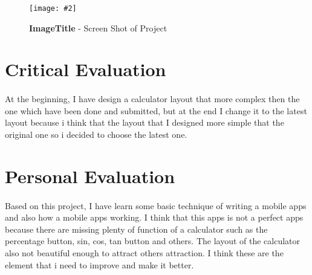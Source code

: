 \documentclass[10pt, a4paper]{article}
\newcommand{\figuremacro}[5]{
    \begin{figure}[#1]
        \centering
        \texttt{[image: \#2]}
        \caption[#3]{\textbf{#3}#4}
        \label{fig:#2}
    \end{figure}
}
\begin{document}
	\figuremacro{h}{Untitled}{ImageTitle}{ - Screen Shot of Project }{1.0}
	
	\section{Critical Evaluation}
	\paragraph{}
	At the beginning, I have design a calculator layout that more complex then the one which have been done and submitted, but at the end I change it to the latest layout because i think that the layout that I designed more simple that the original one so i decided to choose the latest one.
	
	\section{Personal Evaluation}
    \paragraph{}
     Based on this project, I have learn some basic technique of writing a mobile apps and also how a mobile apps working. I think that this apps is not a perfect apps because there are missing plenty of function of a calculator such as the percentage button, sin, cos, tan button and others. The layout of the calculator also not beautiful enough to attract others attraction. I think these are the element that i need to improve and make it better. 
     
	
	
  
 
\end{document}
